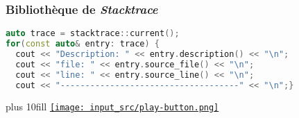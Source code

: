 \documentclass[C++.tex]{subfiles}
\begin{document}
\begin{frame}[fragile]
	\frametitle{Bibliothèque de \textit{Stacktrace}}
	\begin{lstlisting}[language=C++]
auto trace = stacktrace::current();
for(const auto& entry: trace) {
  cout << "Description: " << entry.description() << "\n";
  cout << "file: " << entry.source_file() << "\n";
  cout << "line: " << entry.source_line() << "\n";
  cout << "------------------------------------" << "\n";}\end{lstlisting}

	\vskip 10mm plus 10fill
	\hfill
	\href{https://godbolt.org/#g:!((g:!((g:!((h:codeEditor,i:(filename:'1',fontScale:14,fontUsePx:'0',j:1,lang:c%2B%2B,selection:(endColumn:1,endLineNumber:20,positionColumn:1,positionLineNumber:20,selectionStartColumn:1,selectionStartLineNumber:20,startColumn:1,startLineNumber:20),source:'%23include+%3Cstacktrace%3E%0A%23include+%3Ciostream%3E%0A%0Avoid+foo()%0A%7B%0A++auto+trace+%3D+std::stacktrace::current()%3B%0A++for+(const+auto%26+entry:+trace)%0A++%7B%0A++++std::cout+%3C%3C+%22Description:+%22+%3C%3C+entry.description()+%3C%3C+%22%5Cn%22%3B%0A++++std::cout+%3C%3C+%22file:+%22+%3C%3C+entry.source_file()+%3C%3C+%22%5Cn%22%3B%0A++++std::cout+%3C%3C+%22line:+%22+%3C%3C+entry.source_line()+%3C%3C+%22%5Cn%22%3B%0A++++std::cout+%3C%3C+%22------------------------------------%22+%3C%3C+%22%5Cn%22%3B%0A++%7D%0A%7D%0A%0Aint+main()%0A%7B%0A++foo()%3B%0A%7D%0A'),l:'5',n:'0',o:'C%2B%2B+source+%231',t:'0')),k:50,l:'4',n:'0',o:'',s:0,t:'0'),(g:!((h:executor,i:(argsPanelShown:'1',compilationPanelShown:'0',compiler:g122,compilerName:'',compilerOutShown:'0',execArgs:'',execStdin:'',fontScale:14,fontUsePx:'0',j:1,lang:c%2B%2B,libs:!((name:boost,ver:'175')),options:'-std%3Dc%2B%2B23+-Wall+-Wextra+-pedantic+-lstdc%2B%2B_libbacktrace',overrides:!(),source:1,stdinPanelShown:'1',tree:'1',wrap:'0'),l:'5',n:'0',o:'Executor+x86-64+gcc+12.2+(C%2B%2B,+Editor+%231)',t:'0')),header:(),k:50,l:'4',n:'0',o:'',s:0,t:'0')),l:'2',n:'0',o:'',t:'0')),version:4}{\texttt{[image: input\_src/play-button.png]}}
\end{frame}
\end{document}
